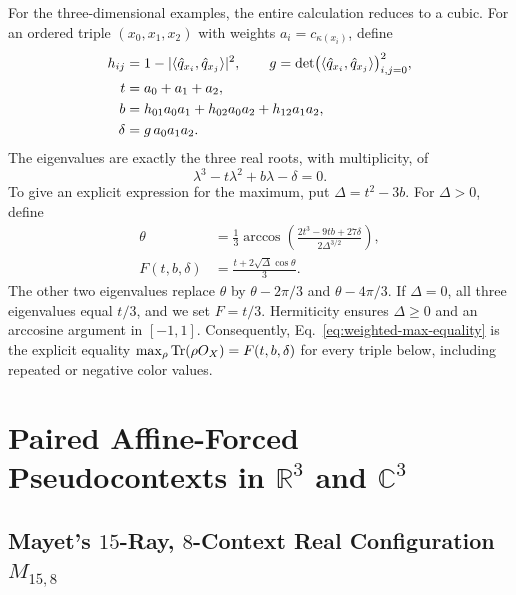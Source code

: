 \documentclass[aps,pra,reprint,superscriptaddress,longbibliography,nofootinbib,floatfix,10pt]{revtex4-2}
\theoremstyle{definition}\newtheorem{definition}[theorem]{Definition}
\theoremstyle{remark}\newtheorem{remark}[theorem]{Remark}
\newcommand{\C}{\mathbb C}\newcommand{\R}{\mathbb R}\newcommand{\Q}{\mathbb Q}
\begin{document}
For the three-dimensional examples, the entire calculation reduces to a cubic. For an ordered triple $(x_0,x_1,x_2)$ with weights $a_i=c_{\kappa(x_i)}$, define
\begin{equation}\label{eq:weighted-triple-coefficients}
\begin{aligned}
h_{ij}&=1-|\langle \hat q_{x_i},\hat q_{x_j}\rangle|^2,\qquad
g=\det\bigl(\langle \hat q_{x_i},\hat q_{x_j}\rangle\bigr)_{i,j=0}^2,\\
t&=a_0+a_1+a_2,\\
b&=h_{01}a_0a_1+h_{02}a_0a_2+h_{12}a_1a_2,\\
\delta&=g\,a_0a_1a_2.
\end{aligned}
\end{equation}
The eigenvalues are exactly the three real roots, with multiplicity, of
\begin{equation}\label{eq:weighted-cubic}
\lambda^3-t\lambda^2+b\lambda-\delta=0.
\end{equation}
To give an explicit expression for the maximum, put $\Delta=t^2-3b$. For $\Delta>0$, define
\begin{equation}\label{eq:weighted-cubic-maximum}
\begin{aligned}
\theta&=\frac13\arccos\!\left(
\frac{2t^3-9tb+27\delta}{2\Delta^{3/2}}\right),\\
F(t,b,\delta)&=\frac{t+2\sqrt\Delta\cos\theta}{3}.
\end{aligned}
\end{equation}
The other two eigenvalues replace $\theta$ by $\theta-2\pi/3$ and $\theta-4\pi/3$. If $\Delta=0$, all three eigenvalues equal $t/3$, and we set $F=t/3$. Hermiticity ensures $\Delta\ge0$ and an arccosine argument in $[-1,1]$. Consequently, Eq.~\eqref{eq:weighted-max-equality} is the explicit equality $\max_\rho\operatorname{Tr}(\rho O_X)=F(t,b,\delta)$ for every triple below, including repeated or negative color values.

\section{Paired Affine-Forced Pseudocontexts in \texorpdfstring{$\R^3$ and $\C^3$}{R3 and C3}}\label{sec:paired-affine}

\subsection{Mayet's \texorpdfstring{$15$}{15}-Ray, \texorpdfstring{$8$}{8}-Context Real Configuration \texorpdfstring{$M_{15,8}$}{M15,8}}\label{sec:mayet}
\end{document}
